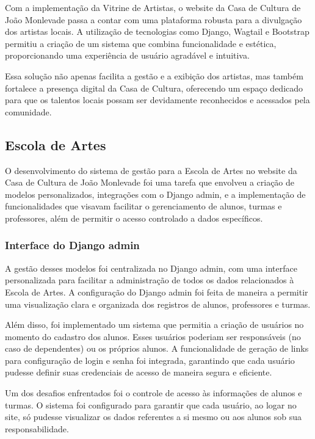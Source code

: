 Com a implementação da Vitrine de Artistas, o website da Casa de Cultura de João Monlevade passa a contar com uma plataforma robusta para a divulgação dos artistas locais. A utilização de tecnologias como Django, Wagtail e Bootstrap permitiu a criação de um sistema que combina funcionalidade e estética, proporcionando uma experiência de usuário agradável e intuitiva.

Essa solução não apenas facilita a gestão e a exibição dos artistas, mas também fortalece a presença digital da Casa de Cultura, oferecendo um espaço dedicado para que os talentos locais possam ser devidamente reconhecidos e acessados pela comunidade.

\subsection{Escola de Artes}

O desenvolvimento do sistema de gestão para a Escola de Artes no website da Casa de Cultura de João Monlevade foi uma tarefa que envolveu a criação de modelos personalizados, integrações com o Django admin, e a implementação de funcionalidades que visavam facilitar o gerenciamento de alunos, turmas e professores, além de permitir o acesso controlado a dados específicos.

\subsubsection{Interface do Django admin}

A gestão desses modelos foi centralizada no Django admin, com uma interface personalizada para facilitar a administração de todos os dados relacionados à Escola de Artes. A configuração do Django admin foi feita de maneira a permitir uma visualização clara e organizada dos registros de alunos, professores e turmas.

Além disso, foi implementado um sistema que permitia a criação de usuários no momento do cadastro dos alunos. Esses usuários poderiam ser responsáveis (no caso de dependentes) ou os próprios alunos. A funcionalidade de geração de links para configuração de login e senha foi integrada, garantindo que cada usuário pudesse definir suas credenciais de acesso de maneira segura e eficiente.

Um dos desafios enfrentados foi o controle de acesso às informações de alunos e turmas. O sistema foi configurado para garantir que cada usuário, ao logar no site, só pudesse visualizar os dados referentes a si mesmo ou aos alunos sob sua responsabilidade.

